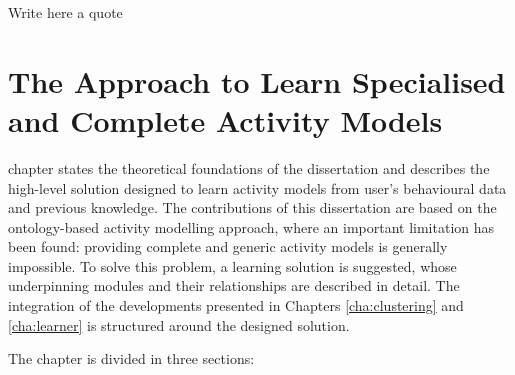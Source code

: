

\begin{savequote}[50mm]
Write here a quote
\end{savequote}


\chapter{The Approach to Learn Specialised and Complete Activity Models}
\label{cha:archi}

\ifpdf
    \graphicspath{{3_approach_to_learning_eam/figures/PDF/}{3_approach_to_learning_eam/figures/PNG/}{3_approach_to_learning_eam/figures/}}
\else
    \graphicspath{{3_approach_to_learning_eam/figures/EPS/}{3_approach_to_learning_eam/figures/}}
\fi

 chapter states the theoretical foundations of the dissertation and describes the high-level solution designed to learn activity models from user's behavioural data and previous knowledge. The contributions of this dissertation are based on the ontology-based activity modelling approach, where an important limitation has been found: providing complete and generic activity models is generally impossible. To solve this problem, a learning solution is suggested, whose underpinning modules and their relationships are described in detail. The integration of the developments presented in Chapters \ref{cha:clustering} and \ref{cha:learner} is structured around the designed solution.


The chapter is divided in three sections:

